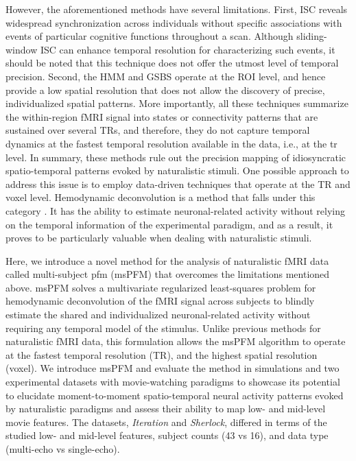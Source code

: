 However, the aforementioned methods have several limitations. First, ISC reveals
widespread synchronization across individuals without specific associations with
events of particular cognitive functions throughout a scan. Although
sliding-window ISC can enhance temporal resolution for characterizing such
events, it should be noted that this technique does not offer the utmost level
of temporal precision. Second, the HMM and GSBS operate at the ROI level, and
hence provide a low spatial resolution that does not allow the discovery of
precise, individualized spatial patterns. More importantly, all these techniques
summarize the within-region fMRI signal into states or connectivity patterns
that are sustained over several TRs, and therefore, they do not capture temporal
dynamics at the fastest temporal resolution available in the data, i.e., at the
\acrshort*{tr} level. In summary, these methods rule out the precision mapping
of idiosyncratic spatio-temporal patterns evoked by naturalistic stimuli. One
possible approach to address this issue is to employ data-driven techniques that
operate at the TR and voxel level. Hemodynamic deconvolution is a method that
falls under this category \citep{Gaudes2010Detectioncharacterizationsingle,
Karahanoglu2013TotalactivationfMRI,
Urunuela2023HemodynamicDeconvolutionDemystified}. It has the ability to estimate
neuronal-related activity without relying on the temporal information of the
experimental paradigm, and as a result, it proves to be particularly valuable
when dealing with naturalistic stimuli.

Here, we introduce a novel method for the analysis of naturalistic fMRI data
called multi-subject \acrlong*{pfm} (msPFM) that overcomes the limitations
mentioned above. msPFM solves a multivariate regularized least-squares problem
for hemodynamic deconvolution of the fMRI signal across subjects to blindly
estimate the shared and individualized neuronal-related activity without
requiring any temporal model of the stimulus. Unlike previous methods for
naturalistic fMRI data, this formulation allows the msPFM algorithm to operate
at the fastest temporal resolution (TR), and the highest spatial resolution
(voxel). We introduce msPFM and evaluate the method in simulations and two
experimental datasets with movie-watching paradigms to showcase its potential to
elucidate moment-to-moment spatio-temporal neural activity patterns evoked by
naturalistic paradigms and assess their ability to map low- and mid-level movie
features. The datasets, \textit{Iteration} and \textit{Sherlock}, differed in
terms of the studied low- and mid-level features, subject counts (43 vs 16), and
data type (multi-echo vs single-echo).

